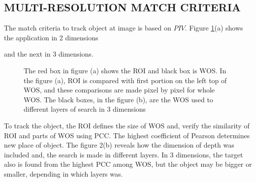 
\subsection{MULTI-RESOLUTION MATCH CRITERIA}
The match criteria to track object at image is based on $PIV$. 
Figure \ref{fig:multires}(a) shows the application in 2 dimensions 

and the next in 3 dimensions.

\begin{figure}[H]
\centering
  \caption{The red box in figure (a) shows the ROI and black box is WOS. In the figure (a), 
  ROI is compared with first portion on the left top of WOS, and these comparisons are made 
  pixel by pixel for whole WOS. The black boxes, in the figure (b), are the WOS used 
  to different layers of search in 3 dimensions}
  \label{fig:multires}
\end{figure}

To track the object, the ROI defines the size of WOS and, verify the similarity 
of ROI and parts of WOS using PCC. 
The highest coefficient of Pearson determines new place of object. The figure 2(b) 
reveals how the dimension of depth was included and, 
the search is made in different layers. In 3 dimensions, the target also is found 
from the highest PCC among WOS, but the object may be 
bigger or smaller, depending in which layers was.\\
